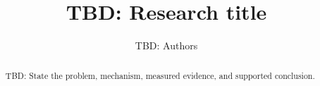 \documentclass[11pt]{article}
\title{TBD: Research title}
\author{TBD: Authors}
\date{}
\begin{document}
\maketitle
\begin{abstract}
TBD: State the problem, mechanism, measured evidence, and supported conclusion.
\end{abstract}






\end{document}
